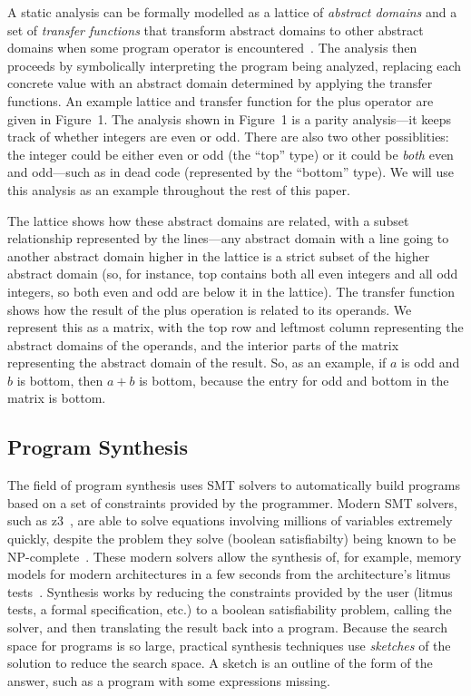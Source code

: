 \documentclass[10pt,conference]{IEEEtran}
\begin{document}
A static analysis can be formally modelled
as a lattice of \textit{abstract domains} and a set of \textit{transfer functions}
that transform abstract domains to other abstract domains when some
program operator is encountered~\cite{cousot77}. The analysis then proceeds by symbolically
interpreting the program being analyzed, replacing each concrete value with
an abstract domain determined by applying the transfer functions. An example
lattice and transfer function for the plus operator are given in Figure~1.
The analysis shown in Figure~1 is a parity analysis---it keeps track of
whether integers are even or odd.
There are also two other possiblities:
the integer could be either even or odd (the ``top'' type) or it could
be \textit{both} even and odd---such as in dead code (represented by the
``bottom'' type).
We will use this analysis as an
example throughout the rest of this paper.

The lattice shows how these abstract domains are related,
with a subset relationship represented by the lines---any abstract domain
with a line going to another abstract domain higher in the lattice is a strict
subset of the higher abstract domain (so, for instance, top contains both
all even integers and all odd integers, so both even and odd are below it in the lattice).
The transfer function shows how the result of the plus operation is related
to its operands. We represent this as a matrix, with the top row and leftmost
column representing the abstract domains of the operands, and the interior
parts of the matrix representing the abstract domain of the result. So,
as an example, if $a$ is odd and $b$ is bottom, then $a + b$ is bottom,
because the entry for odd and bottom in the matrix is bottom.

\subsection{Program Synthesis}
\label{sec-synth}

The field of program synthesis uses SMT solvers to
automatically build programs based on a set of constraints provided
by the programmer. Modern SMT solvers, such as z3~\cite{z3}, are able
to solve equations involving millions of variables extremely quickly, despite 
the problem they solve (boolean satisfiabilty) being known to be NP-complete~\cite{cook71complexity}. 
These modern solvers allow the synthesis of, for example, memory models for modern architectures
in a few seconds from the architecture's litmus tests~\cite{bornholt17}.
Synthesis works by reducing the constraints provided by the user
(litmus tests, a formal specification, etc.) to a boolean satisfiability
problem, calling the solver, and then translating the result back into
a program. Because the search space for programs is so large, practical
synthesis techniques use \textit{sketches} of the solution to reduce
the search space. A sketch is an outline of the form of the answer,
such as a program with some expressions missing.
\end{document}
